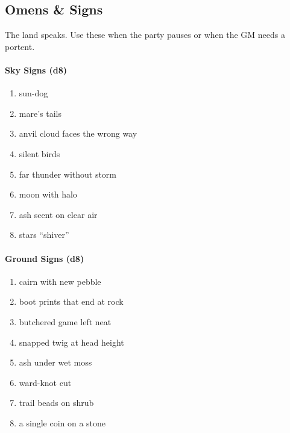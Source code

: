 \subsection*{Omens \& Signs}
\label{sec:wilderness-omens}
The land speaks. Use these when the party pauses or when the GM needs a portent.

\paragraph{Sky Signs (d8)}
\begin{enumerate}
  \item sun-dog
  \item mare's tails
  \item anvil cloud faces the wrong way
  \item silent birds
  \item far thunder without storm
  \item moon with halo
  \item ash scent on clear air
  \item stars ``shiver''
\end{enumerate}

\paragraph{Ground Signs (d8)}
\begin{enumerate}
  \item cairn with new pebble
  \item boot prints that end at rock
  \item butchered game left neat
  \item snapped twig at head height
  \item ash under wet moss
  \item ward-knot cut
  \item trail beads on shrub
  \item a single coin on a stone
\end{enumerate}

